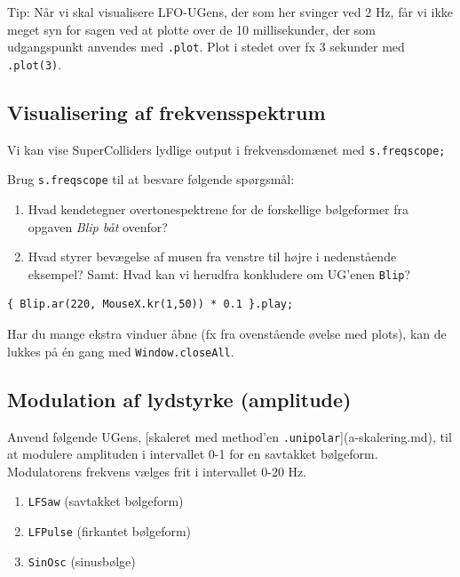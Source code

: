 Tip: Når vi skal visualisere LFO-UGens, der som her svinger ved 2 Hz, får vi ikke meget syn for sagen ved at plotte over de 10 millisekunder, der som udgangspunkt anvendes med \texttt{.plot}. Plot i stedet over fx 3 sekunder med \texttt{{}.plot(3)}.
\subsection{Visualisering af frekvensspektrum}

Vi kan vise SuperColliders lydlige output i frekvensdomænet med \texttt{s.freqscope;}

Brug \texttt{s.freqscope} til at besvare følgende spørgsmål:

            \begin{enumerate}
            \item Hvad kendetegner overtonespektrene for de forskellige bølgeformer fra opgaven \textit{Blip båt} ovenfor?
\item Hvad styrer bevægelse af musen fra venstre til højre i nedenstående eksempel? Samt: Hvad kan vi herudfra konkludere om UG'enen \texttt{Blip}? 
            \end{enumerate}

\begin{listing}[H]
\begin{verbatim}
{ Blip.ar(220, MouseX.kr(1,50)) * 0.1 }.play;
\end{verbatim}
\caption{Undersøgelse af UGen'en Blip}
\end{listing}

Har du mange ekstra vinduer åbne (fx fra ovenstående øvelse med plots), kan de lukkes på én gang med \texttt{Window.closeAll}.
\subsection{Modulation af lydstyrke (amplitude)}

Anvend følgende UGens, [skaleret med method'en \texttt{.unipolar}](a-skalering.md), til at modulere amplituden i intervallet 0-1 for en savtakket bølgeform. Modulatorens frekvens vælges frit i intervallet 0-20 Hz.

            \begin{enumerate}
            \item \texttt{LFSaw} (savtakket bølgeform)
\item \texttt{LFPulse} (firkantet bølgeform)
\item \texttt{SinOsc} (sinusbølge) 
            \end{enumerate}

